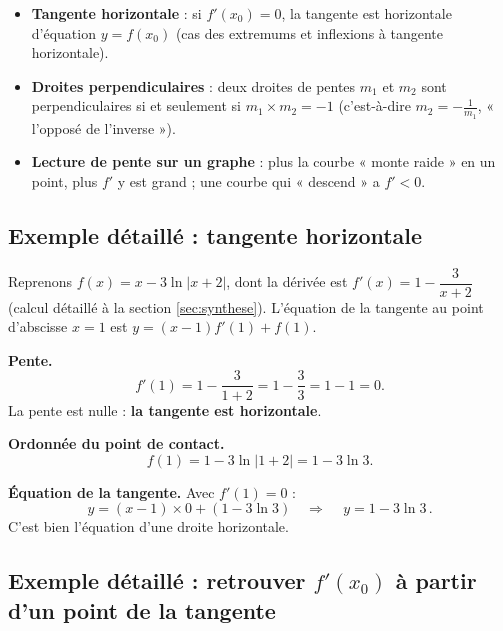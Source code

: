 \documentclass[11pt,a4paper]{article}
\begin{document}
\begin{remarque}
\begin{itemize}[leftmargin=1.6em,topsep=2pt,itemsep=2pt]
  \item \textbf{Tangente horizontale} : si $f'(x_0)=0$, la tangente est horizontale d'équation
        $y=f(x_0)$ (cas des extremums et inflexions à tangente horizontale).
  \item \textbf{Droites perpendiculaires} : deux droites de pentes $m_1$ et $m_2$ sont
        perpendiculaires si et seulement si $m_1\times m_2=-1$ (c'est-à-dire $m_2=-\tfrac{1}{m_1}$,
        « l'opposé de l'inverse »).
  \item \textbf{Lecture de pente sur un graphe} : plus la courbe « monte raide » en un point, plus
        $f'$ y est grand ; une courbe qui « descend » a $f'<0$.
\end{itemize}
\end{remarque}

\subsection{Exemple détaillé : tangente horizontale}

\begin{exemple}[Une tangente horizontale en $x=1$ pour $f(x)=x-3\ln|x+2|$]
Reprenons $f(x)=x-3\ln|x+2|$, dont la dérivée est $f'(x)=1-\dfrac{3}{x+2}$ (calcul détaillé à la
section \ref{sec:synthese}). L'équation de la tangente au point d'abscisse $x=1$ est
$y=(x-1)f'(1)+f(1)$.

\medskip
\textbf{Pente.}
\[
   f'(1)=1-\frac{3}{1+2}=1-\frac{3}{3}=1-1=0.
\]
La pente est nulle : \textbf{la tangente est horizontale}.

\medskip
\textbf{Ordonnée du point de contact.}
\[
   f(1)=1-3\ln|1+2|=1-3\ln 3.
\]

\textbf{Équation de la tangente.} Avec $f'(1)=0$ :
\[
   y=(x-1)\times 0+(1-3\ln 3)\quad\Longrightarrow\quad \boxed{\,y=1-3\ln 3\,}.
\]
C'est bien l'équation d'une droite horizontale.
\end{exemple}

\subsection{Exemple détaillé : retrouver $f'(x_0)$ à partir d'un point de la tangente}
\end{document}
